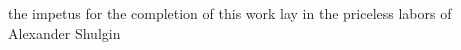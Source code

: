 {%
	the impetus for the completion of this work lay in the priceless labors of Alexander Shulgin
}
\clearpage